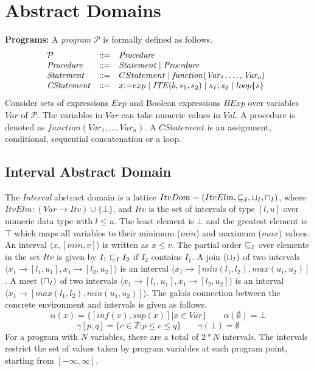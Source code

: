 \section{Abstract Domains}
\textbf{Programs:}
%
A {\em program} $\mathcal{P}$ is formally defined as follows.
\[
\begin{array}[t]{@{}lll}
\mathcal{P} & {:}{:}{=} & \mathit{Procedure} \\
\mathit{Procedure} & {:}{:}{=} & \mathit{Statement} \mid \mathit{Procedure} \\
\mathit{Statement} & {:}{:}{=} & CStatement \mid \mathit{function(Var_1,\dots,Var_n)} \\
\mathit{CStatement} & {:}{:}{=} & x {:}{=} exp \mid \mathit{ITE}(b, s_1,s_2) \mid \mathit{s_1;s_2} \mid loop\{s\} \\
\end{array}
\]
Consider sets of expressions $Exp$ and Boolean expressions $BExp$
over variables $Var$ of $\mathcal{P}$.  The variables in $Var$ 
can take numeric values in $Val$.  A procedure is denoted as 
$\mathit{function(Var_1,\dots,Var_n)}$.  A $\mathit{CStatement}$ 
is an assignment, conditional, sequential concatenation or a loop.
\subsection{Interval Abstract Domain}
The {\em Interval} abstract domain is a lattice 
$ItvDom = (ItvElm, \sqsubseteq_{I}, \sqcup_{I}, \sqcap_{I})$, where
$ItvElm: (Var \rightarrow Itv) \cup \{\bot\}$, and $Itv$ is 
the set of intervals of type $[l,u]$ over numeric data 
type with $l \leq u$. The least element is $\bot$ and the 
greatest element is $\top$ which maps all variables to their
minimum ($min$) and maximum ($max$) values.  An interval 
$\langle x, [min, v] \rangle$ is written as $x \leq v$.  The 
partial order $\sqsubseteq_{I}$ over elements in the set $Itv$ is 
given by $I_1 \sqsubseteq_{I} I_2$ if $I_2$ contains $I_1$.
A join $(\sqcup_{I})$ of two intervals $\langle x_1 \rightarrow [l_1, u_1], 
x_1 \rightarrow [l_2, u_2] \rangle$ is an interval 
$\langle x_1 \rightarrow [min(l_1, l_2), max(u_1, u_2)]$.
A meet $(\sqcap_{I})$ of two intervals $\langle x_1 \rightarrow [l_1, u_1], 
x_1 \rightarrow [l_2, u_2] \rangle$ is an interval 
$\langle x_1 \rightarrow [max(l_1, l_2), min(u_1, u_2)] \rangle$.
The galois connection between the concrete environment and intervals is 
given as follows.
\[\alpha(x) = \{[inf(x), sup(x)] | x \in Var\} \qquad   \alpha(\emptyset) = \bot \]
\[\gamma[p,q] = \{c \in \mathbb{Z} | p \leq c \leq q\} \qquad \gamma(\bot) = \emptyset \]
For a program with $N$ variables, there are a total of 
$2*N$ intervals. The intervals restrict the set of values 
taken by program variables at each program point, starting 
from $[-\infty, \infty]$.   

